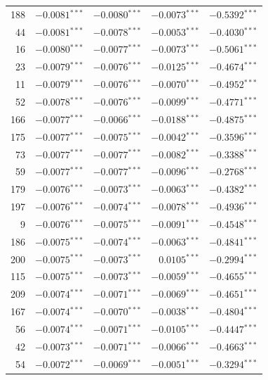 \documentclass[review,authoryear]{elsarticle}
\begin{document}
\begin{longtable}{rrrrr}
188 & $-0.0081$$^{***}$ & $-0.0080$$^{***}$ & $-0.0073$$^{***}$ & $-0.5392$$^{***}$ \\
44 & $-0.0081$$^{***}$ & $-0.0078$$^{***}$ & $-0.0053$$^{***}$ & $-0.4030$$^{***}$ \\
16 & $-0.0080$$^{***}$ & $-0.0077$$^{***}$ & $-0.0073$$^{***}$ & $-0.5061$$^{***}$ \\
23 & $-0.0079$$^{***}$ & $-0.0076$$^{***}$ & $-0.0125$$^{***}$ & $-0.4674$$^{***}$ \\
11 & $-0.0079$$^{***}$ & $-0.0076$$^{***}$ & $-0.0070$$^{***}$ & $-0.4952$$^{***}$ \\
52 & $-0.0078$$^{***}$ & $-0.0076$$^{***}$ & $-0.0099$$^{***}$ & $-0.4771$$^{***}$ \\
166 & $-0.0077$$^{***}$ & $-0.0066$$^{***}$ & $-0.0188$$^{***}$ & $-0.4875$$^{***}$ \\
175 & $-0.0077$$^{***}$ & $-0.0075$$^{***}$ & $-0.0042$$^{***}$ & $-0.3596$$^{***}$ \\
73 & $-0.0077$$^{***}$ & $-0.0077$$^{***}$ & $-0.0082$$^{***}$ & $-0.3388$$^{***}$ \\
59 & $-0.0077$$^{***}$ & $-0.0077$$^{***}$ & $-0.0096$$^{***}$ & $-0.2768$$^{***}$ \\
179 & $-0.0076$$^{***}$ & $-0.0073$$^{***}$ & $-0.0063$$^{***}$ & $-0.4382$$^{***}$ \\
197 & $-0.0076$$^{***}$ & $-0.0074$$^{***}$ & $-0.0078$$^{***}$ & $-0.4936$$^{***}$ \\
9 & $-0.0076$$^{***}$ & $-0.0075$$^{***}$ & $-0.0091$$^{***}$ & $-0.4548$$^{***}$ \\
186 & $-0.0075$$^{***}$ & $-0.0074$$^{***}$ & $-0.0063$$^{***}$ & $-0.4841$$^{***}$ \\
200 & $-0.0075$$^{***}$ & $-0.0073$$^{***}$ & $0.0105$$^{***}$ & $-0.2994$$^{***}$ \\
115 & $-0.0075$$^{***}$ & $-0.0073$$^{***}$ & $-0.0059$$^{***}$ & $-0.4655$$^{***}$ \\
209 & $-0.0074$$^{***}$ & $-0.0071$$^{***}$ & $-0.0069$$^{***}$ & $-0.4651$$^{***}$ \\
167 & $-0.0074$$^{***}$ & $-0.0070$$^{***}$ & $-0.0038$$^{***}$ & $-0.4804$$^{***}$ \\
56 & $-0.0074$$^{***}$ & $-0.0071$$^{***}$ & $-0.0105$$^{***}$ & $-0.4447$$^{***}$ \\
42 & $-0.0073$$^{***}$ & $-0.0071$$^{***}$ & $-0.0066$$^{***}$ & $-0.4663$$^{***}$ \\
54 & $-0.0072$$^{***}$ & $-0.0069$$^{***}$ & $-0.0051$$^{***}$ & $-0.3294$$^{***}$ \\

\end{longtable}
\end{document}
